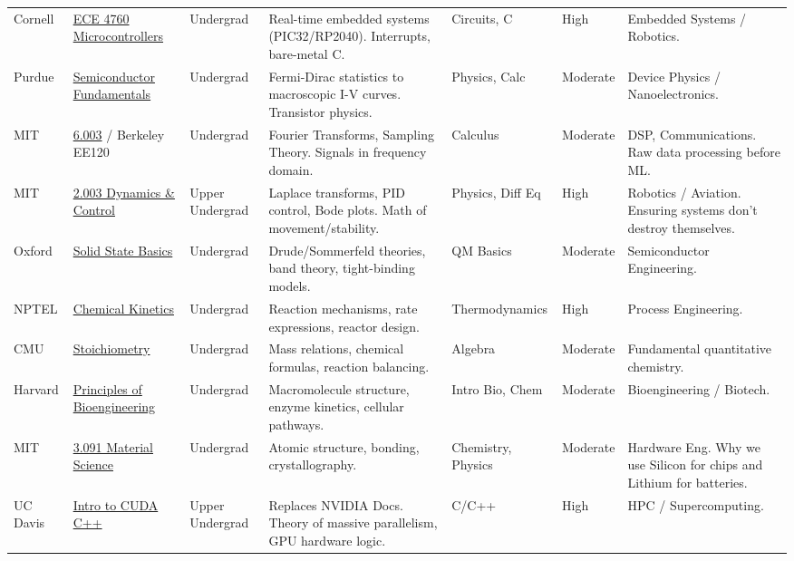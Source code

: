 \documentclass[10pt, a4paper, landscape]{article}
\begin{document}
\begin{longtable}{L{2cm} L{3.5cm} L{1.8cm} L{6cm} L{3.5cm} L{2cm} L{5cm}}
    \addlinespace
    Cornell & \href{https://ocw.ece.cornell.edu/courses/ece-4760-designing-with-microcontrollers/}{ECE 4760 Microcontrollers} & Undergrad & Real-time embedded systems (PIC32/RP2040). Interrupts, bare-metal C. & Circuits, C & High & Embedded Systems / Robotics. \\
    \addlinespace
    Purdue & \href{https://www.youtube.com/watch?v=ucF468EPOK4}{Semiconductor Fundamentals} & Undergrad & Fermi-Dirac statistics to macroscopic I-V curves. Transistor physics. & Physics, Calc & Moderate & Device Physics / Nanoelectronics. \\
    \addlinespace
    MIT & \href{https://ocw.mit.edu/courses/6-003-signals-and-systems-fall-2011/}{6.003} / Berkeley EE120 & Undergrad & Fourier Transforms, Sampling Theory. Signals in frequency domain. & Calculus & Moderate & DSP, Communications. Raw data processing before ML. \\
    \addlinespace
    MIT & \href{https://ocw.mit.edu/courses/2-003j-dynamics-and-control-i-fall-2007/}{2.003 Dynamics \& Control} & Upper Undergrad & Laplace transforms, PID control, Bode plots. Math of movement/stability. & Physics, Diff Eq & High & Robotics / Aviation. Ensuring systems don't destroy themselves. \\
    \addlinespace
    Oxford & \href{https://podcasts.ox.ac.uk/series/oxford-solid-state-basics}{Solid State Basics} & Undergrad & Drude/Sommerfeld theories, band theory, tight-binding models. & QM Basics & Moderate & Semiconductor Engineering. \\
    \addlinespace
    NPTEL & \href{https://nptel.ac.in/courses/103103026}{Chemical Kinetics} & Undergrad & Reaction mechanisms, rate expressions, reactor design. & Thermodynamics & High & Process Engineering. \\
    \addlinespace
    CMU & \href{https://oli.cmu.edu/courses/stoichiometry-open-free/}{Stoichiometry} & Undergrad & Mass relations, chemical formulas, reaction balancing. & Algebra & Moderate & Fundamental quantitative chemistry. \\
    \addlinespace
    Harvard & \href{https://pll.harvard.edu/course/principles-biochemistry}{Principles of Bioengineering} & Undergrad & Macromolecule structure, enzyme kinetics, cellular pathways. & Intro Bio, Chem & Moderate & Bioengineering / Biotech. \\
    \addlinespace
    \addlinespace
    MIT & \href{https://ocw.mit.edu/courses/3-091sc-introduction-to-solid-state-chemistry-fall-2010/}{3.091 Material Science} & Undergrad & Atomic structure, bonding, crystallography. & Chemistry, Physics & Moderate & Hardware Eng. Why we use Silicon for chips and Lithium for batteries. \\
    \addlinespace
    UC Davis & \href{https://www.youtube.com/playlist?list=PLGvfHSglmk4aweyWIhMxrLrFHL4L25xWW}{Intro to CUDA C++} & Upper Undergrad & Replaces NVIDIA Docs. Theory of massive parallelism, GPU hardware logic. & C/C++ & High & HPC / Supercomputing. \\


\end{longtable}
\end{document}
